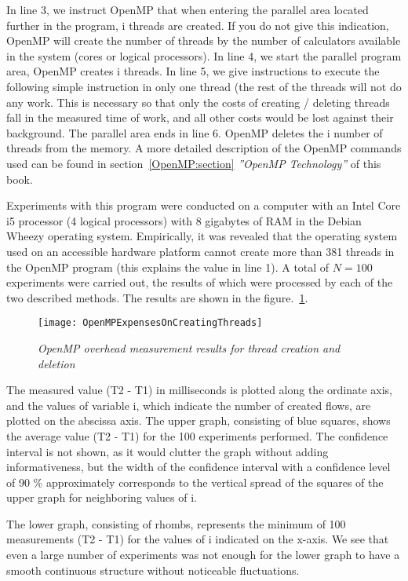 {	\begin{figure}[H]
		
	\end{figure}
	In line 3, we instruct OpenMP that when entering the parallel area located further in the program, i threads are created. If you do not give this indication, OpenMP will create the number of threads by the number of calculators available in the system (cores or logical processors). In line 4, we start the parallel program area, OpenMP creates i threads. In line 5, we give instructions to execute the following simple instruction in only one thread (the rest of the threads will not do any work. This is necessary so that only the costs of creating / deleting threads fall in the measured time of work, and all other costs would be lost against their background. The parallel area ends in line 6. OpenMP deletes the i number of  threads from the memory. A more detailed description of the OpenMP commands used can be found in section~\ref{OpenMP:section} \textit{''OpenMP Technology''} of this book.
	\par Experiments with this program were conducted on a computer with an Intel Core i5 processor (4 logical processors) with 8 gigabytes of RAM in the Debian Wheezy operating system. Empirically, it was revealed that the operating system used on an accessible hardware platform cannot create more than 381 threads in the OpenMP program (this explains the value in line 1). A total of $N = 100$ experiments were carried out, the results of which were processed by each of the two described methods. The results are shown in the figure.~\ref{OpenMPExpensesOnCreatingThreads:image}.
	\begin{figure}[H]
		\texttt{[image: OpenMPExpensesOnCreatingThreads]}
		\caption{\textit{OpenMP overhead measurement results for thread creation and deletion}}
		\label{OpenMPExpensesOnCreatingThreads:image}
	\end{figure} 
	\par The measured value (T2 - T1) in milliseconds is plotted along the ordinate axis, and the values of variable i, which indicate the number of created flows, are plotted on the abscissa axis. The upper graph, consisting of blue squares, shows the average value (T2 - T1) for the 100 experiments performed. The confidence interval is not shown, as it would clutter the graph without adding informativeness, but the width of the confidence interval with a confidence level of 90 \% approximately corresponds to the vertical spread of the squares of the upper graph for neighboring values of i.
	\par The lower graph, consisting of rhombs, represents the minimum of 100 measurements (T2 - T1) for the values of i indicated on the x-axis. We see that even a large number of experiments was not enough for the lower graph to have a smooth continuous structure without noticeable fluctuations.

}